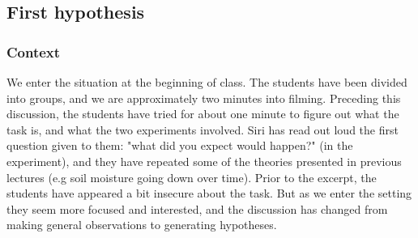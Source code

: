 \subsection{First hypothesis}
\subsubsection*{Context}
\label{firsthypothesis}
We enter the situation at the beginning of class. The students have been divided into groups, and we are approximately two minutes into filming. Preceding this discussion, the students have tried for about one minute to figure out what the task is, and what the two experiments involved. Siri has read out loud the first question given to them: "what did you expect would happen?" (in the experiment), and they have repeated some of the theories presented in previous lectures (e.g soil moisture going down over time). Prior to the excerpt, the students have appeared a bit insecure about the task. But as we enter the setting they seem more focused and interested, and the discussion has changed from making general observations to generating hypotheses.

